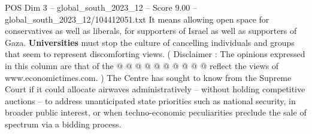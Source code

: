\begin{textsample}{POS Dim 3 – global\_south\_2023\_12 – Score 9.00 – global\_south\_2023\_12/104412051.txt}
It means allowing open space for conservatives as well as liberals, for supporters of Israel as well as supporters of Gaza. \textbf{Universities} must stop the culture of cancelling individuals and groups that seem to represent discomforting views. ( Disclaimer : The opinions expressed in this column are that of the @ @ @ @ @ @ @ @ @ @ reflect the views of www.economictimes.com. ) The Centre has sought to know from the Supreme Court if it could allocate airwaves administratively -- without holding competitive auctions -- to address unanticipated state priorities such as national security, in broader public interest, or when techno-economic peculiarities preclude the sale of spectrum via a bidding process.

\end{textsample}
